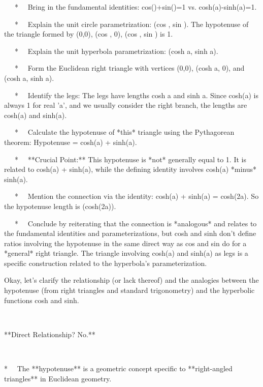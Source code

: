 \documentclass{article}
\newcommand{\nonconverted}[1]{\mbox{}}
\begin{document}
{\ \ \ * \ \ Bring in the fundamental identities:
cos{\texttwosuperior}({\theta})+sin{\texttwosuperior}({\theta})=1 vs.
cosh{\texttwosuperior}(a)-sinh{\texttwosuperior}(a)=1.

\ \ \ * \ \ Explain the unit circle parametrization: (cos {\theta}, sin
{\theta}). The hypotenuse of the triangle formed by (0,0), (cos {\theta}, 0),
(cos {\theta}, sin {\theta}) is 1.

\ \ \ * \ \ Explain the unit hyperbola parametrization: (cosh a, sinh a).

\ \ \ * \ \ Form the Euclidean right triangle with vertices (0,0), (cosh a,
0), and (cosh a, sinh a).

\ \ \ * \ \ Identify the legs: The legs have lengths \textbar cosh a\textbar 
and \textbar sinh a\textbar . Since cosh(a) is always {\geq} 1 for real 'a',
and we usually consider the right branch, the lengths are cosh(a) and \textbar
sinh(a)\textbar .

\ \ \ * \ \ Calculate the hypotenuse of *this* triangle using the Pythagorean
theorem: Hypotenuse{\texttwosuperior} = cosh{\texttwosuperior}(a) +
sinh{\texttwosuperior}(a).

\ \ \ * \ \ **Crucial Point:** This hypotenuse is *not* generally equal to 1.
It is related to cosh{\texttwosuperior}(a) + sinh{\texttwosuperior}(a), while
the defining identity involves cosh{\texttwosuperior}(a) *minus*
sinh{\texttwosuperior}(a).

\ \ \ * \ \ Mention the connection via the identity:
cosh{\texttwosuperior}(a) + sinh{\texttwosuperior}(a) = cosh(2a). So the
hypotenuse length is  \nonconverted{sqrt} (cosh(2a)).

\ \ \ * \ \ Conclude by reiterating that the connection is *analogous* and
relates to the fundamental identities and parameterizations, but cosh and sinh
don't define ratios involving the hypotenuse in the same direct way as cos and
sin do for a *general* right triangle. The triangle involving cosh(a) and
sinh(a) as legs is a specific construction related to the hyperbola's
parameterization.}

Okay, let's clarify the relationship (or lack thereof) and the analogies
between the hypotenuse (from right triangles and standard trigonometry) and
the hyperbolic functions cosh and sinh.

\

**Direct Relationship? No.**

\

* \ \ The **hypotenuse** is a geometric concept specific to **right-angled
triangles** in Euclidean geometry.
\end{document}
